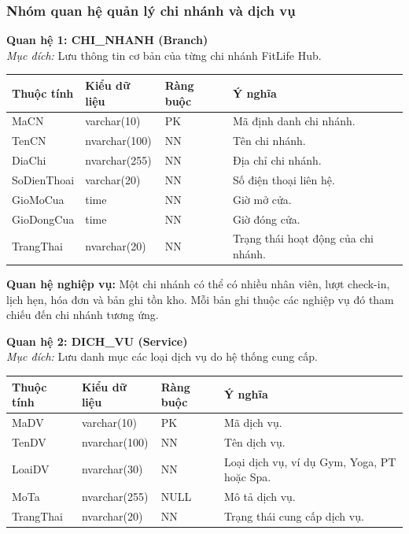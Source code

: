 \documentclass[11pt, a4paper]{article}
\begin{document}
\subsubsection{Nhóm quan hệ quản lý chi nhánh và dịch vụ}

\textbf{Quan hệ 1: CHI\_NHANH (Branch)} \\
\textit{Mục đích:} Lưu thông tin cơ bản của từng chi nhánh FitLife Hub.

\begin{small}
\begin{tabularx}{\textwidth}{| C{2.8cm} | C{2.4cm} | C{2cm} | Y |}
\hline
\textbf{Thuộc tính} & \textbf{Kiểu dữ liệu} & \textbf{Ràng buộc} & \textbf{Ý nghĩa} \\
\hline
MaCN & varchar(10) & PK & Mã định danh chi nhánh. \\
\hline
TenCN & nvarchar(100) & NN & Tên chi nhánh. \\
\hline
DiaChi & nvarchar(255) & NN & Địa chỉ chi nhánh. \\
\hline
SoDienThoai & varchar(20) & NN & Số điện thoại liên hệ. \\
\hline
GioMoCua & time & NN & Giờ mở cửa. \\
\hline
GioDongCua & time & NN & Giờ đóng cửa. \\
\hline
TrangThai & nvarchar(20) & NN & Trạng thái hoạt động của chi nhánh. \\
\hline
\end{tabularx}
\end{small}

\textbf{Quan hệ nghiệp vụ:} Một chi nhánh có thể có nhiều nhân viên, lượt check-in, lịch hẹn, hóa đơn và bản ghi tồn kho. Mỗi bản ghi thuộc các nghiệp vụ đó tham chiếu đến chi nhánh tương ứng.

\vspace{0.8em}
\textbf{Quan hệ 2: DICH\_VU (Service)} \\
\textit{Mục đích:} Lưu danh mục các loại dịch vụ do hệ thống cung cấp.

\begin{small}
\begin{tabularx}{\textwidth}{| C{2.8cm} | C{2.4cm} | C{2cm} | Y |}
\hline
\textbf{Thuộc tính} & \textbf{Kiểu dữ liệu} & \textbf{Ràng buộc} & \textbf{Ý nghĩa} \\
\hline
MaDV & varchar(10) & PK & Mã dịch vụ. \\
\hline
TenDV & nvarchar(100) & NN & Tên dịch vụ. \\
\hline
LoaiDV & nvarchar(30) & NN & Loại dịch vụ, ví dụ Gym, Yoga, PT hoặc Spa. \\
\hline
MoTa & nvarchar(255) & NULL & Mô tả dịch vụ. \\
\hline
TrangThai & nvarchar(20) & NN & Trạng thái cung cấp dịch vụ. \\
\hline
\end{tabularx}
\end{small}
\end{document}
